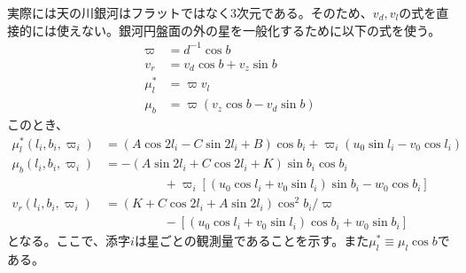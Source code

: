 実際には天の川銀河はフラットではなく3次元である。そのため、$v_d,v_l$の式を直接的には使えない。銀河円盤面の外の星を一般化するために以下の式を使う。
\begin{subequations}
\begin{align}
	\varpi &= d^{-1} \cos b \\
	v_r &= v_d \cos b + v_z \sin b \\
	\mu^*_l &= \varpi v_l \\
	\mu_b &= \varpi(v_z \cos b - v_d \sin b)
\end{align}
\end{subequations}
このとき、
\begin{subequations}
\begin{align}
	\mu^*_l(l_i,b_i,\varpi_i) &= (A\cos2l_i - C\sin2l_i + B)\cos b_i + \varpi_i(u_0\sin l_i - v_0\cos l_i) \\
	\mu_b(l_i,b_i,\varpi_i) &= -(A\sin2l_i + C\cos2l_i + K)\sin b_i \cos b_i \nonumber \\
	                          & \hspace{2cm} + \varpi_i[(u_0\cos l_i + v_0 \sin l_i)\sin b_i - w_0 \cos b_i] \\
	v_r(l_i,b_i,\varpi_i) &= (K + C\cos2l_i + A\sin2l_i)\cos^2 b_i / \varpi \nonumber \\
	                      & \hspace{2cm} - [(u_0\cos l_i + v_0 \sin l_i)\cos b_i + w_0 \sin b_i]
\end{align}
\end{subequations}
となる。ここで、添字$i$は星ごとの観測量であることを示す。また$\mu^*_l \equiv \mu_l \cos b$である。

